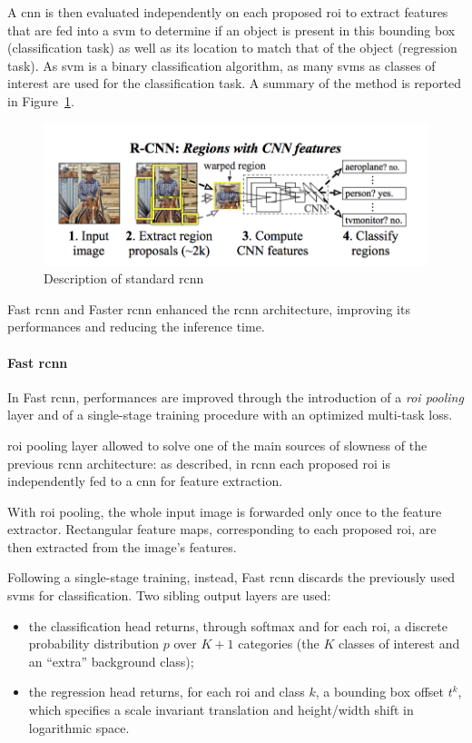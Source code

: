 \documentclass[%
    corpo=12pt,
    twoside,
    stile=classica,   
    tipotesi=magistrale,
    evenboxes,
    english,
	numerazioneromana,
]{toptesi}
\newcommand{\quotes}[1]{``#1''}
\begin{document}
A \gls{cnn} is then evaluated independently on each proposed \gls{roi} to extract features that are fed into a \gls{svm}
to determine if an object is present in this bounding box (classification task) as well as its location to match that of the object (regression task). As \gls{svm} is a binary classification algorithm, as many \glspl{svm} as classes of interest are used for the classification task. A summary of the method is reported in Figure~\ref{fig:rcnn}.

\begin{figure}[ht]
	\centering
	\includegraphics[width=.8\linewidth]{imgs/rcnn.png}
	\caption{Description of standard \gls{rcnn}\cite{girshick2014rich}}
	\label{fig:rcnn}
\end{figure}

\medskip
Fast \gls{rcnn}\cite{girshick2015fast} and Faster \gls{rcnn}\cite{ren2016faster} enhanced the \gls{rcnn} architecture, improving its performances and reducing the inference time.

\paragraph{Fast \gls{rcnn}}
In Fast \gls{rcnn}\cite{girshick2015fast}, performances are improved through the introduction of a \textit{\gls{roi} pooling} layer and of a single-stage training procedure with an optimized multi-task loss.

\medskip
\Gls{roi} pooling layer allowed to solve one of the main sources of slowness of the previous \gls{rcnn} architecture: as described, in \gls{rcnn} each proposed \gls{roi} is independently fed to a \gls{cnn} for feature extraction.

With \gls{roi} pooling, the whole input image is forwarded only once to the feature extractor. Rectangular feature maps, corresponding to each proposed \gls{roi}, are then extracted from the image's features.

\medskip
Following a single-stage training, instead, Fast \gls{rcnn} discards the previously used \glspl{svm} for classification. Two sibling output layers are used:
\begin{itemize}
	\item the classification head returns, through softmax and for each \gls{roi}, a discrete probability distribution $p$ over $K+1$ categories (the $K$ classes of interest and an \quotes{extra} background class);
	\item the regression head returns, for each \gls{roi} and class $k$, a bounding box offset $t^k$, which specifies a scale invariant translation and height/width shift in logarithmic space.
\end{itemize}
\end{document}
